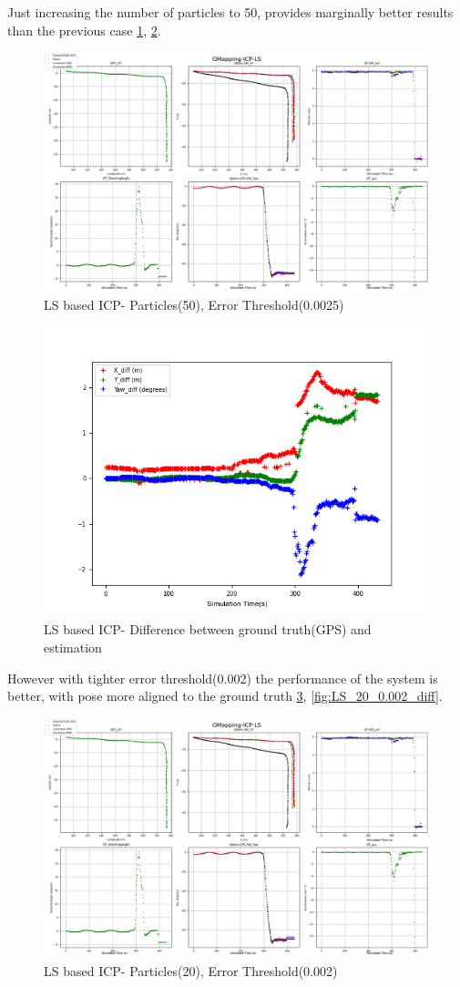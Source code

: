 \clearpage
Just increasing the number of particles to 50, provides marginally better results than the previous case \ref{fig:LS_50_0.0025}, \ref{fig:LS_50_0.0025_diff}.
    \begin{figure}[h] 
        \includegraphics[height=0.6\textwidth]{images/GMapping-ICP-LS_Map_50_0.0025.png}
        \caption{LS based ICP- Particles(50), Error Threshold(0.0025)}
        \label{fig:LS_50_0.0025}
    \end{figure}
    \begin{figure}[h] 
        \includegraphics[height=0.4\textwidth]{images/GMapping-ICP-LS_True_vs_Crct_50_0.0025.png}
        \caption{LS based ICP- Difference between ground truth(GPS) and estimation}
        \label{fig:LS_50_0.0025_diff}
    \end{figure}
\clearpage
However with tighter error threshold(0.002) the performance of the system is better, with pose more aligned to the ground truth \ref{fig:LS_20_0.002}, \ref{fig:LS_20_0.002_diff}.
    \begin{figure}[h] 
        \includegraphics[height=0.6\textwidth]{images/GMapping-ICP-LS_Map_20_0.002.png}
        \caption{LS based ICP- Particles(20), Error Threshold(0.002)}
        \label{fig:LS_20_0.002}
    \end{figure}
